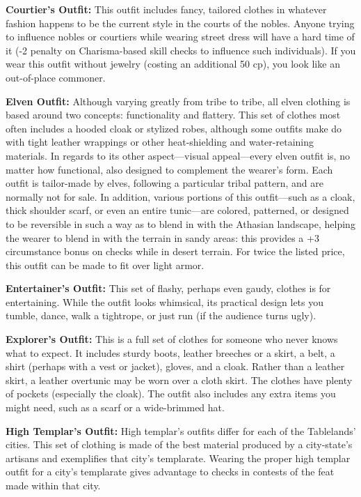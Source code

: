 \textbf{Courtier's Outfit:} This outfit includes fancy, tailored clothes in whatever fashion happens to be the current style in the courts of the nobles. Anyone trying to influence nobles or courtiers while wearing street dress will have a hard time of it (-2 penalty on Charisma-based skill checks to influence such individuals). If you wear this outfit without jewelry (costing an additional 50 cp), you look like an out-of-place commoner.

\textbf{Elven Outfit:} Although varying greatly from tribe to tribe, all elven clothing is based around two concepts: functionality and flattery. This set of clothes most often includes a hooded cloak or stylized robes, although some outfits make do with tight leather wrappings or other heat-shielding and water-retaining materials. In regards to its other aspect---visual appeal---every elven outfit is, no matter how functional, also designed to complement the wearer's form. Each outfit is tailor-made by elves, following a particular tribal pattern, and are normally not for sale. In addition, various portions of this outfit---such as a cloak, thick shoulder scarf, or even an entire tunic---are colored, patterned, or designed to be reversible in such a way as to blend in with the Athasian landscape, helping the wearer to blend in with the terrain in sandy areas: this provides a +3 circumstance bonus on  checks while in desert terrain. For twice the listed price, this outfit can be made to fit over light armor.

\textbf{Entertainer's Outfit:} This set of flashy, perhaps even gaudy, clothes is for entertaining. While the outfit looks whimsical, its practical design lets you tumble, dance, walk a tightrope, or just run (if the audience turns ugly).

\textbf{Explorer's Outfit:} This is a full set of clothes for someone who never knows what to expect. It includes sturdy boots, leather breeches or a skirt, a belt, a shirt (perhaps with a vest or jacket), gloves, and a cloak. Rather than a leather skirt, a leather overtunic may be worn over a cloth skirt. The clothes have plenty of pockets (especially the cloak). The outfit also includes any extra items you might need, such as a scarf or a wide-brimmed hat.

\textbf{High Templar's Outfit:} High templar's outfits differ for each of the Tablelands' cities. This set of clothing is made of the best material produced by a city-state's artisans and exemplifies that city's templarate. Wearing the proper high templar outfit for a city's templarate gives advantage to  checks in contests of the  feat made within that city.

